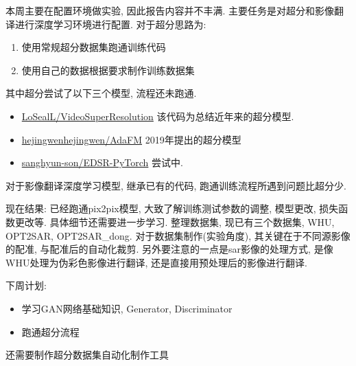 本周主要在配置环境做实验, 因此报告内容并不丰满. 主要任务是对超分和影像翻译进行深度学习环境进行配置. 对于超分思路为: 

\begin{enumerate}
    \item 使用常规超分数据集跑通训练代码 
    \item 使用自己的数据根据要求制作训练数据集
\end{enumerate}

其中超分尝试了以下三个模型, 流程还未跑通. 

\begin{itemize}
    \item \href{https://github.com/LoSealL/VideoSuperResolution}{LoSealL/VideoSuperResolution} 该代码为总结近年来的超分模型.
    \item \href{https://github.com/hejingwenhejingwen/AdaFM}{hejingwenhejingwen/AdaFM} 2019年提出的超分模型
    \item \href{https://github.com/sanghyun-son/EDSR-PyTorch}{sanghyun-son/EDSR-PyTorch} 尝试中.
\end{itemize}

对于影像翻译深度学习模型, 继承已有的代码, 跑通训练流程所遇到问题比超分少.

现在结果: 已经跑通pix2pix模型, 大致了解训练测试参数的调整, 模型更改, 损失函数更改等. 具体细节还需要进一步学习. 整理数据集, 现已有三个数据集, WHU, OPT2SAR, OPT2SAR\_dong. 对于数据集制作(实验角度), 其关键在于不同源影像的配准, 与配准后的自动化裁剪. 另外要注意的一点是sar影像的处理方式, 是像WHU处理为伪彩色影像进行翻译, 还是直接用预处理后的影像进行翻译. 

下周计划:
\begin{itemize}
    \item 学习GAN网络基础知识, Generator, Discriminator
    \item 跑通超分流程
\end{itemize}

还需要制作超分数据集自动化制作工具





